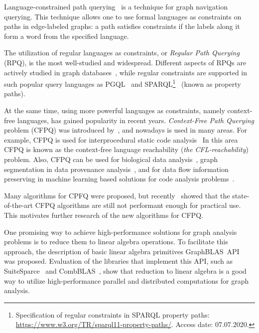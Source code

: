 
Language-constrained path querying~\cite{barrett2000formal} is a technique for graph navigation querying.
This technique allows one to use formal languages as constraints on paths in edge-labeled graphs: a path satisfies constraints if the labels along it form a word from the specified language.

The utilization of regular languages as constraints, or \textit{Regular Path Querying} (RPQ), is the most well-studied and widespread.
Different aspects of RPQs are actively studied in graph databases~\cite{10.1145/2463664.2465216, 10.1145/3104031,10.1145/2850413}, while regular constraints are supported in such popular query languages as PGQL~\cite{10.1145/2960414.2960421} and SPARQL\footnote{Specification of regular constraints in SPARQL property paths: \url{https://www.w3.org/TR/sparql11-property-paths/}. Access date: 07.07.2020.}~\cite{10.1007/978-3-319-25007-6_1} (known as property paths).

At the same time, using more powerful languages  as constraints, namely context-free languages, has gained popularity in recent years.
\textit{Context-Free Path Querying} problem (CFPQ) was introduced by~\cite{Yannakakis}, and nowadays is used in many areas.
For example, CFPQ is used for interprocedural static code analysis~\cite{10.1145/3158118,10.5555/271338.271343, YanSCA, Zheng:2008:DAA:1328897.1328464}
In this area CFPQ is known as the context-free language reachability (\textit{the CFL-reachability}) problem.
Also, CFPQ can be used for biological data analysis~\cite{GraphQueryWithEarley}, graph segmentation in data provenance analysis~\cite{8731467}, and for data flow information preserving in machine learning based solutions for code analysis problems~\cite{10.1145/3428301}.

Many algorithms for CPFQ were proposed, but recently~\cite{Kuijpers:2019:ESC:3335783.3335791} showed that the state-of-the-art CFPQ algorithms are still not performant enough for practical use.
This motivates further research of the new algorithms for CFPQ.

One promising way to achieve high-performance solutions for graph analysis problems is to reduce them to linear algebra operations.
To facilitate this approach, the description of basic linear algebra primitives GraphBLAS~API~\cite{7761646} was proposed.
Evaluation of the libraries that implement this API, such as SuiteSparce~\cite{10.1145/3322125} and CombBLAS~\cite{10.1177/1094342011403516}, show that reduction to linear algebra is a good way to utilize high-performance parallel and distributed computations for graph analysis.


